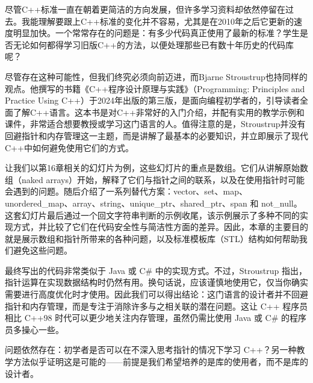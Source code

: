 尽管C++标准一直在朝着更简洁的方向发展，但许多学习资料却依然停留在过去。我能理解要跟上C++标准的变化并不容易，尤其是在2010年之后它更新的速度明显加快。一个常常存在的问题是：有多少代码真正使用了最新的标准？学生是否无论如何都得学习旧版C++的方法，以便处理那些已有数十年历史的代码库呢？

尽管存在这种可能性，但我们终究必须向前迈进，而Bjarne Stroustrup也持同样的观点。他撰写的书籍《C++程序设计原理与实践》（Programming: Principles and Practice Using C++）于2024年出版的第三版，是面向编程初学者的，引导读者全面了解C++语言。这本书是对C++非常好的入门介绍，并配有实用的教学示例和课件，非常适合想要教授或学习这门语言的人。值得注意的是，Stroustrup并没有回避指针和内存管理这一主题，而是讲解了最基本的必要知识，并立即展示了现代C++中如何避免使用它们的方式。

让我们以第16章相关的幻灯片为例，这些幻灯片的重点是数组。它们从讲解原始数组（naked arrays）开始，解释了它们与指针之间的联系，以及在使用指针时可能会遇到的问题。随后介绍了一系列替代方案：vector、set、map、unordered\_map、array、string、unique\_ptr、shared\_ptr、span 和 not\_null。这套幻灯片最后通过一个回文字符串判断的示例收尾，该示例展示了多种不同的实现方式，并比较了它们在代码安全性与简洁性方面的差异。因此，本章的主要目的就是展示数组和指针所带来的各种问题，以及标准模板库（STL）结构如何帮助我们避免这些问题。

最终写出的代码非常类似于 Java 或 C\# 中的实现方式。不过，Stroustrup 指出，指针运算在实现数据结构时仍然有用。换句话说，应该谨慎地使用它，仅当你确实需要进行高度优化时才使用。因此我们可以得出结论：这门语言的设计者并不回避指针和内存管理，而是专注于消除许多与之相关联的潜在问题。这让 C++ 程序员相比 C++98 时代可以更少地关注内存管理，虽然仍需比使用 Java 或 C\# 的程序员多操心一些。

问题依然存在：初学者是否可以在不深入思考指针的情况下学习 C++？另一种教学方法似乎证明这是可能的——前提是我们希望培养的是库的使用者，而不是库的设计者。